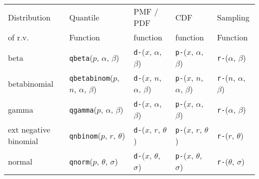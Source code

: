 \begin{table}[b]
\centering
\small
\begin{tabular}{l | llll}
Distribution                  & Quantile  & PMF / PDF  &CDF       & Sampling  \\ 
of r.v. &  Function & function         & function &  Function \\ \hline
beta & \texttt{qbeta}($p$, $\alpha$, $\beta$)             
& \texttt{d-}($x$, $\alpha$, $\beta$)
& \texttt{p-}($x$, $\alpha$, $\beta$) 
& \texttt{r-}($\alpha$, $\beta$) \\
betabinomial & \texttt{qbetabinom}($p$, $n$, $\alpha$, $\beta$)              
& \texttt{d-}($x$, $n$, $\alpha$, $\beta$)
& \texttt{p-}($x$, $n$, $\alpha$, $\beta$) 
& \texttt{r-}($n$, $\alpha$, $\beta$) \\






gamma & \texttt{qgamma}($p$, $\alpha$, $\beta$) 
& \texttt{d-}($x$, $\alpha$, $\beta$)
& \texttt{p-}($x$, $\alpha$, $\beta$) 
& \texttt{r-}($\alpha$, $\beta$) \\




ext negative binomial & \texttt{qnbinom}($p$, $r$, $\theta$) 
& \texttt{d-}($x$, $r$, $\theta$) 
& \texttt{p-}($x$, $r$, $\theta$) 
& \texttt{r-}($r$, $\theta$) \\

normal & \texttt{qnorm}($p$, $\theta$, $\sigma$) 
& \texttt{d-}($x$, $\theta$, $\sigma$)
& \texttt{p-}($x$, $\theta$, $\sigma$) 
& \texttt{r-}($\theta$, $\sigma$) \\


\end{tabular}
\end{table}
